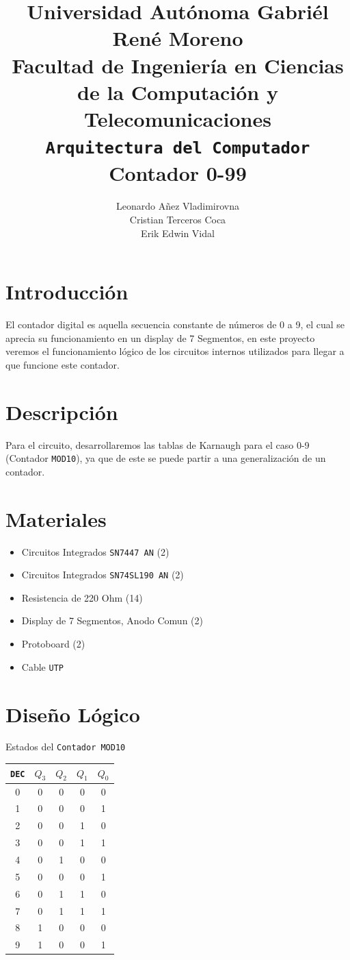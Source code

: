 \documentclass[10pt,letterpaper]{report}
\author{
Leonardo Añez Vladimirovna\\
Cristian Terceros Coca\\
Erik Edwin Vidal
}
\title{
Universidad Autónoma Gabriél René Moreno \\
Facultad de Ingeniería en Ciencias de la  Computación y Telecomunicaciones \\\vspace{1cm}
\texttt{Arquitectura del Computador} \\\vspace{3cm}
Contador 0-99\\\vspace{2cm}}
\begin{document}
\maketitle

\section*{Introducción}
El contador digital es aquella secuencia constante de números de 0 a 9, el cual se aprecia su funcionamiento en un display de 7 Segmentos, en este proyecto veremos el
funcionamiento lógico de los circuitos internos utilizados para llegar a que funcione este contador.
\section*{Descripción}
Para el circuito, desarrollaremos las tablas de Karnaugh para el caso 0-9 (Contador \texttt{MOD10}), ya que de este se puede partir a una generalización de un contador.
\section*{Materiales}
\begin{itemize}
\item Circuitos Integrados \texttt{SN7447 AN} (2)
\item Circuitos Integrados \texttt{SN74SL190 AN} (2)
\item Resistencia de 220 Ohm (14)
\item Display de 7 Segmentos, Anodo Comun (2)
\item Protoboard (2)
\item Cable \texttt{UTP}
\end{itemize}
\section*{Diseño Lógico}
Estados del \texttt{Contador MOD10}
\begin{center}
\begin{tabular}{|c|c|c|c|c|}
\hline 
\texttt{DEC} & $Q_3$ & $Q_2$ & $Q_1$ & $Q_0$ \\ 
\hline 
0 & 0 & 0 & 0 & 0 \\ 
\hline 
1 & 0 & 0 & 0 & 1 \\ 
\hline 
2 & 0 & 0 & 1 & 0 \\ 
\hline 
3 & 0 & 0 & 1 & 1 \\ 
\hline 
4 & 0 & 1 & 0 & 0 \\ 
\hline 
5 & 0 & 0 & 0 & 1 \\ 
\hline 
6 & 0 & 1 & 1 & 0 \\ 
\hline 
7 & 0 & 1 & 1 & 1 \\ 
\hline 
8 & 1 & 0 & 0 & 0 \\ 
\hline 
9 & 1 & 0 & 0 & 1 \\ 
\hline 
\end{tabular} 
\end{center}
\end{document}
